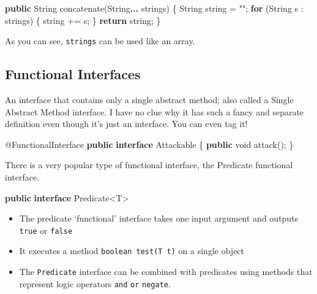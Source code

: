\documentclass[]{article}
\newenvironment{Shaded}{}{}
\newcommand{\AttributeTok}[1]{\textcolor[rgb]{0.49,0.56,0.16}{#1}}
\newcommand{\BuiltInTok}[1]{#1}
\newcommand{\DataTypeTok}[1]{\textcolor[rgb]{0.56,0.13,0.00}{#1}}
\newcommand{\FunctionTok}[1]{\textcolor[rgb]{0.02,0.16,0.49}{#1}}
\newcommand{\KeywordTok}[1]{\textcolor[rgb]{0.00,0.44,0.13}{\textbf{#1}}}
\newcommand{\NormalTok}[1]{#1}
\newcommand{\StringTok}[1]{\textcolor[rgb]{0.25,0.44,0.63}{#1}}
\providecommand{\tightlist}{%
  \setlength{\itemsep}{0pt}\setlength{\parskip}{0pt}}
\begin{document}
\begin{Shaded}
\begin{Highlighting}[]
\KeywordTok{public} \BuiltInTok{String} \FunctionTok{concatenate}\NormalTok{(}\BuiltInTok{String}\KeywordTok{... }\NormalTok{strings) \{}
    \BuiltInTok{String}\NormalTok{ string = }\StringTok{""}\NormalTok{;}
    \KeywordTok{for}\NormalTok{ (}\BuiltInTok{String}\NormalTok{ s : strings) \{}
\NormalTok{        string += s;}
\NormalTok{    \}}
    \KeywordTok{return}\NormalTok{ string;}
\NormalTok{\}}
\end{Highlighting}
\end{Shaded}

As you can see, \texttt{strings} can be used like an array.

\hypertarget{functional-interfaces}{%
\subsection{Functional Interfaces}\label{functional-interfaces}}

An interface that contains only a single abstract method; also called a
Single Abstract Method interface. I have no clue why it has such a fancy
and separate definition even though it's just an interface. You can even
tag it!

\begin{Shaded}
\begin{Highlighting}[]
\AttributeTok{@FunctionalInterface}
\KeywordTok{public} \KeywordTok{interface}\NormalTok{ Attackable \{}
    \KeywordTok{public} \DataTypeTok{void} \FunctionTok{attack}\NormalTok{();}
\NormalTok{\}}
\end{Highlighting}
\end{Shaded}

There is a very popular type of functional interface, the Predicate
functional interface.

\begin{Shaded}
\begin{Highlighting}[]
\KeywordTok{public} \KeywordTok{interface} \BuiltInTok{Predicate}\NormalTok{<T>}
\end{Highlighting}
\end{Shaded}

\begin{itemize}
\tightlist
\item
  The predicate `functional' interface takes one input argument and
  outputs \texttt{true} or \texttt{false}
\item
  It executes a method \texttt{boolean\ test(T\ t)} on a single object
\item
  The \texttt{Predicate} interface can be combined with predicates using
  methods that represent logic operators \texttt{and} \texttt{or}
  \texttt{negate}.
\end{itemize}
\end{document}
